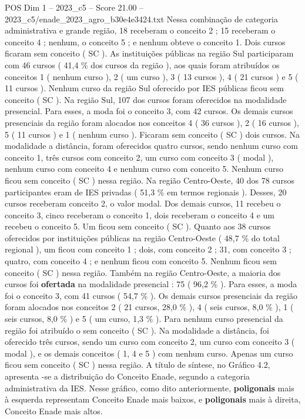 \begin{textsample}{POS Dim 1 – 2023\_c5 – Score 21.00 – 2023\_c5/enade\_2023\_agro\_b30e4e3424.txt}
Nessa combinação de categoria administrativa e grande região, 18 receberam o conceito 2 ; 15 receberam o conceito 4 ; nenhum, o conceito 5 ; e nenhum obteve o conceito 1.
Dois cursos ficaram sem conceito ( SC ).
As instituições públicas na região Sul participaram com 46 cursos ( 41,4 \% dos cursos da região ), aos quais foram atribuídos os conceitos 1 ( nenhum curso ), 2 ( um curso ), 3 ( 13 cursos ), 4 ( 21 cursos ) e 5 ( 11 cursos ).
Nenhum curso da região Sul oferecido por IES públicas ficou sem conceito ( SC ).
Na região Sul, 107 dos cursos foram oferecidos na modalidade presencial.
Para esses, a moda foi o conceito 3, com 42 cursos.
Os demais cursos presenciais da região foram alocados nos conceitos 4 ( 36 cursos ), 2 ( 16 cursos ), 5 ( 11 cursos ) e 1 ( nenhum curso ).
Ficaram sem conceito ( SC ) dois cursos.
Na modalidade a distância, foram oferecidos quatro cursos, sendo nenhum curso com conceito 1, três cursos com conceito 2, um curso com conceito 3 ( modal ), nenhum curso com conceito 4 e nenhum curso com conceito 5.
Nenhum curso ficou sem conceito ( SC ) nessa região.
Na região Centro-Oeste, 40 dos 78 cursos participantes eram de IES privadas ( 51,3 \% em termos regionais ).
Desses, 20 cursos receberam conceito 2, o valor modal.
Dos demais cursos, 11 recebeu o conceito 3, cinco receberam o conceito 1, dois receberam o conceito 4 e um recebeu o conceito 5.
Um ficou sem conceito ( SC ).
Quanto aos 38 cursos oferecidos por instituições públicas na região Centro-Oeste ( 48,7 \% do total regional ), um ficou com conceito 1 ; dois, com conceito 2 ; 31, com conceito 3 ; quatro, com conceito 4 ; e nenhum ficou com conceito 5.
Nenhum ficou sem conceito ( SC ) nessa região.
Também na região Centro-Oeste, a maioria dos cursos foi \textbf{ofertada} na modalidade presencial : 75 ( 96,2 \% ).
Para esses, a moda foi o conceito 3, com 41 cursos ( 54,7 \% ).
Os demais cursos presenciais da região foram alocados nos conceitos 2 ( 21 cursos, 28,0 \% ), 4 ( seis cursos, 8,0 \% ), 1 ( seis cursos, 8,0 \% ) e 5 ( um curso, 1,3 \% ).
Para nenhum curso presencial da região foi atribuído o sem conceito ( SC ).
Na modalidade a distância, foi oferecido três cursos, sendo um curso com conceito 2, um curso com conceito 3 ( modal ), e os demais conceitos ( 1, 4 e 5 ) com nenhum curso.
Apenas um curso ficou sem conceito ( SC ) nessa região.
A título de síntese, no Gráfico 4.2, apresenta -se a distribuição do Conceito Enade, segundo a categoria administrativa da IES.
Nesse gráfico, como dito anteriormente, \textbf{poligonais} mais à esquerda representam Conceito Enade mais baixos, e \textbf{poligonais} mais à direita, Conceito Enade mais altos.

\end{textsample}
